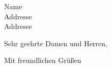 \documentclass[
    DIN, 10pt, pagenumber=false, parskip=half,
    fromalign=right,
    fromrule=false,
    foldmarks=true,
]{scrlttr2}
\begin{document}
\begin{letter}{Name\\Addresse\\Addresse}


\opening{\textbf{\color{headings}{Überschrift}}}

Sehr geehrte Damen und Herren,

\lipsum[1-4]

\closing{Mit freundlichen Grüßen}



\end{letter}
\end{document}

